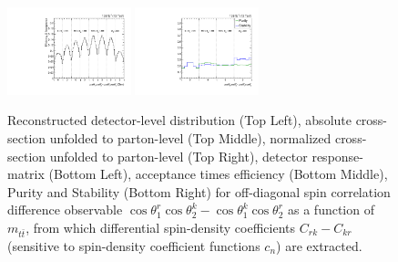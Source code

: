 \begin{figure}[htb]
\begin{center}
 \includegraphics[width=0.32\textwidth]{fig_fullRun2UL/unfolding/combined/TotEff_c_Mrk_mttbar.pdf}
 \includegraphics[width=0.32\textwidth]{fig_fullRun2UL/unfolding/combined/PurStab_c_Mrk_mttbar.pdf} \\
\caption{Reconstructed detector-level distribution (Top Left), absolute cross-section unfolded to parton-level (Top Middle), normalized cross-section unfolded to parton-level (Top Right), detector response-matrix (Bottom Left), acceptance times efficiency (Bottom Middle), Purity and Stability (Bottom Right) for off-diagonal spin correlation difference observable $\cos\theta_{1}^{r}\cos\theta_{2}^{k}-\cos\theta_{1}^{k}\cos\theta_{2}^{r}$ as a function of $m_{t\bar{t}}$, from which differential spin-density coefficients $C_{rk}-C_{kr}$ (sensitive to spin-density coefficient functions $c_n$) are extracted.}
\label{fig:c_Mrk_mttbar}
\end{center}
\end{figure}
\clearpage
